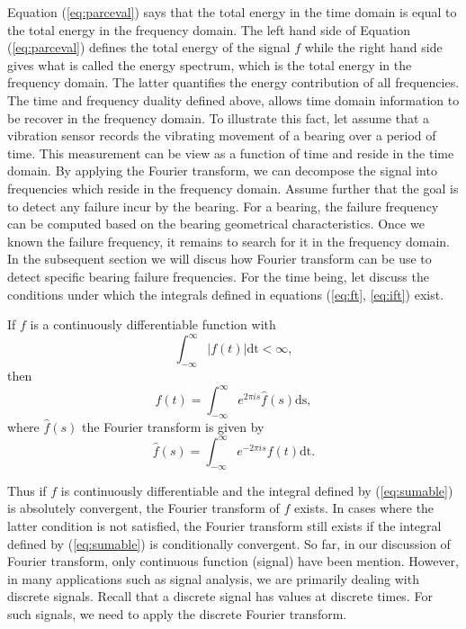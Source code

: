 \documentclass[../Main/thesis.tex]{subfiles}
\begin{document}
Equation (\ref{eq:parceval}) says that the total energy in the time domain is equal to the total energy in the frequency domain. The left hand side of Equation (\ref{eq:parceval}) defines the total energy of the signal $f$ while the right hand side gives what is called the energy spectrum, which is the total energy in the frequency domain. The latter quantifies the energy contribution of all frequencies.
\justify
The time and frequency duality defined above, allows time domain information to be recover in the frequency domain. To illustrate this fact, let assume that a vibration sensor records the vibrating movement of a bearing over a period of time. This measurement can be view as a function of time and reside in the time domain. By applying the Fourier transform, we can decompose the signal into frequencies which reside in the frequency domain. Assume further that the goal is to detect any failure incur by the bearing. For a bearing, the failure frequency can be computed based on the bearing geometrical characteristics. Once we known the failure frequency, it remains to search for it in the frequency domain. In the subsequent section we will discus how Fourier transform can be use to detect specific bearing failure frequencies.
For the time being, let discuss the conditions under which the integrals defined in equations (\ref{eq:ft}, \ref{eq:ift}) exist.
\begin{theorem}
If $f$ is a continuously differentiable function with 
\begin{equation}\label{eq:sumable}
\int_{-\infty}^{\infty}|f(t)|\mathrm{dt} <\infty,
\end{equation}
then
\begin{equation}
f(t) = \int_{-\infty}^{\infty}e^{2\pi i s}\hat{f}(s)\mathrm{ds}, \nonumber
\end{equation}
where $\hat{f}(s)$ the Fourier transform is given by
\begin{equation}
 \hat{f}(s) = \int_{-\infty}^{\infty}e^{-2\pi i s}f(t)\mathrm{dt}. \nonumber
\end{equation}
\end{theorem}
Thus if $f$ is continuously differentiable and the integral defined by (\ref{eq:sumable}) is absolutely convergent, the Fourier transform of $f$ exists. In cases where the latter condition is not satisfied, the Fourier transform still exists if the integral defined by (\ref{eq:sumable}) is conditionally convergent.
\justify
So far, in our discussion of Fourier transform, only continuous function (signal) have been mention. However, in many applications such as signal analysis, we are primarily dealing with discrete signals. Recall that a discrete signal has values at discrete times. For such signals, we need to apply the discrete Fourier transform.
\end{document}
